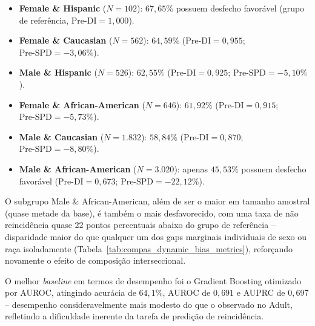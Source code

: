 \begin{itemize}
    \item \textbf{Female \& Hispanic} ($N = 102$): $67,65\%$ possuem desfecho favorável (grupo de referência, $\text{Pre-DI} = 1,000$).
    \item \textbf{Female \& Caucasian} ($N = 562$): $64,59\%$ ($\text{Pre-DI} = 0,955$; $\text{Pre-SPD} = -3,06\%$).
    \item \textbf{Male \& Hispanic} ($N = 526$): $62,55\%$ ($\text{Pre-DI} = 0,925$; $\text{Pre-SPD} = -5,10\%$).
    \item \textbf{Female \& African-American} ($N = 646$): $61,92\%$ ($\text{Pre-DI} = 0,915$; $\text{Pre-SPD} = -5,73\%$).
    \item \textbf{Male \& Caucasian} ($N = 1.832$): $58,84\%$ ($\text{Pre-DI} = 0,870$; $\text{Pre-SPD} = -8,80\%$).
    \item \textbf{Male \& African-American} ($N = 3.020$): apenas $45,53\%$ possuem desfecho favorável ($\text{Pre-DI} = 0,673$; $\text{Pre-SPD} = -22,12\%$).
\end{itemize}

O subgrupo Male \& African-American, além de ser o maior em tamanho amostral (quase metade da base), é também o mais desfavorecido, com uma taxa de não reincidência quase 22 pontos percentuais abaixo do grupo de referência -- disparidade maior do que qualquer um dos gaps marginais individuais de sexo ou raça isoladamente (Tabela~\ref{tab:compas_dynamic_bias_metrics}), reforçando novamente o efeito de composição interseccional.

O melhor \textit{baseline} em termos de desempenho foi o Gradient Boosting otimizado por AUROC, atingindo acurácia de $64,1\%$, AUROC de $0,691$ e AUPRC de $0,697$ -- desempenho consideravelmente mais modesto do que o observado no Adult, refletindo a dificuldade inerente da tarefa de predição de reincidência.

